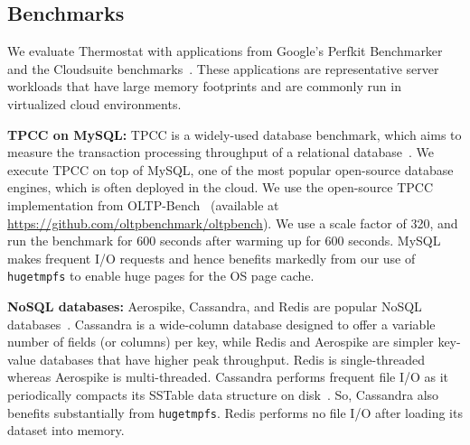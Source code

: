 


\subsection{Benchmarks}
\label{benchmarks}
We evaluate Thermostat with applications from Google's Perfkit Benchmarker and the Cloudsuite
benchmarks~\cite{perfkitbenchmarker, cloudsuite}. These applications are representative server workloads that have
large memory footprints and are commonly run in virtualized cloud environments.

{\bf TPCC on MySQL:} TPCC is a widely-used database benchmark, which aims to measure
the transaction processing throughput of a relational database~\cite{tpcc}. We 
execute TPCC on top of MySQL, one of the most popular open-source database 
engines, which is often deployed in the cloud.  We use the open-source
TPCC implementation from OLTP-Bench~\cite{oltpbench} (available at
\url{https://github.com/oltpbenchmark/oltpbench}). We use a scale factor of
320, and run the benchmark for 600 seconds after warming up for 600 seconds.
MySQL makes frequent I/O requests and hence benefits markedly from our use
of {\tt hugetmpfs} to enable huge pages for the OS page cache.

{\bf NoSQL databases:} Aerospike, Cassandra, and Redis are popular NoSQL
databases~\cite{aerospike, cassandra, redis}.
Cassandra is a wide-column database designed to offer a variable number of fields
(or columns) per key, while Redis and Aerospike are simpler key-value databases 
that have higher peak throughput. Redis is single-threaded whereas Aerospike is
multi-threaded.
Cassandra performs frequent file I/O as it periodically compacts its SSTable
data structure on disk~\cite{ref:sstable}. So, Cassandra also benefits substantially
from {\tt hugetmpfs}. Redis performs no file I/O after loading its dataset into memory.

